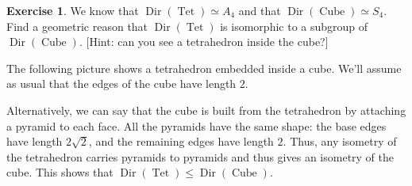 \documentclass{amsart}
\DeclareMathOperator{\Dir}{Dir}
\DeclareMathOperator{\Tet}{Tet}
\DeclareMathOperator{\Cube}{Cube}
\renewcommand{\:}{\colon}
\theoremstyle{definition}
\newtheorem{exercise}{Exercise}
\newenvironment{solution}{{\noindent\bf Solution:}}{}
\begin{document}
\begin{exercise}
 We know that $\Dir(\Tet)\simeq A_4$ and that $\Dir(\Cube)\simeq S_4$.
 Find a geometric reason that $\Dir(\Tet)$ is isomorphic to a subgroup
 of $\Dir(\Cube)$.  [Hint: can you see a tetrahedron inside the cube?]
\end{exercise}
\begin{solution}
 The following picture shows a tetrahedron embedded inside a cube.
 We'll assume as usual that the edges of the cube have length $2$.
 \begin{center}
 \end{center}
 Alternatively, we can say that the cube is built from the tetrahedron
 by attaching a pyramid to each face.  All the pyramids have the same
 shape: the base edges have length $2\sqrt{2}$, and the remaining
 edges have length $2$.  Thus, any isometry of the tetrahedron carries
 pyramids to pyramids and thus gives an isometry of the cube.  This
 shows that $\Dir(\Tet)\leq\Dir(\Cube)$.  
\end{solution}
\end{document}
